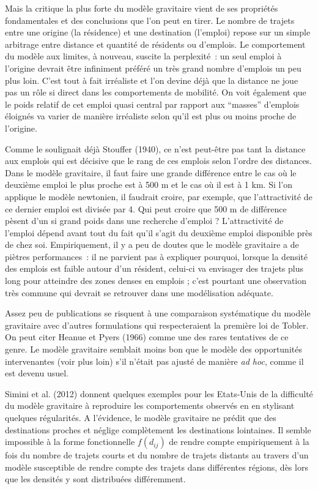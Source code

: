 \documentclass[
  10pt,
  a4paper,
  numbers=noendperiod,
  DIV=9]{scrreprt}
\begin{document}
Mais la critique la plus forte du modèle gravitaire vient de ses
propriétés fondamentales et des conclusions que l'on peut en tirer. Le
nombre de trajets entre une origine (la résidence) et une destination
(l'emploi) repose sur un simple arbitrage entre distance et quantité de
résidents ou d'emplois. Le comportement du modèle aux limites, à
nouveau, suscite la perplexité~: un seul emploi à l'origine devrait être
infiniment préféré un très grand nombre d'emplois un peu plus loin.
C'est tout à fait irréaliste et l'on devine déjà que la distance ne joue
pas un rôle si direct dans les comportements de mobilité. On voit
également que le poids relatif de cet emploi quasi central par rapport
aux ``masses'' d'emplois éloignés va varier de manière irréaliste selon
qu'il est plus ou moins proche de l'origine.

Comme le soulignait déjà Stouffer (1940), ce n'est peut-être pas tant la
distance aux emplois qui est décisive que le rang de ces emplois selon
l'ordre des distances. Dans le modèle gravitaire, il faut faire une
grande différence entre le cas où le deuxième emploi le plus proche est
à 500 m et le cas où il est à 1 km. Si l'on applique le modèle
newtonien, il faudrait croire, par exemple, que l'attractivité de ce
dernier emploi est divisée par 4. Qui peut croire que 500 m de
différence pèsent d'un si grand poids dans une recherche d'emploi ?
L'attractivité de l'emploi dépend avant tout du fait qu'il s'agit du
deuxième emploi disponible près de chez soi. Empiriquement, il y a peu
de doutes que le modèle gravitaire a de piètres performances~: il ne
parvient pas à expliquer pourquoi, lorsque la densité des emplois est
faible autour d'un résident, celui-ci va envisager des trajets plus long
pour atteindre des zones denses en emplois ; c'est pourtant une
observation très commune qui devrait se retrouver dans une modélisation
adéquate.

Assez peu de publications se risquent à une comparaison systématique du
modèle gravitaire avec d'autres formulations qui respecteraient la
première loi de Tobler. On peut citer Heanue et Pyers (1966) comme une
des rares tentatives de ce genre. Le modèle gravitaire semblait moins
bon que le modèle des opportunités intervenantes (voir plus loin) s'il
n'était pas ajusté de manière \emph{ad hoc}, comme il est devenu usuel.

Simini et al. (2012) donnent quelques exemples pour les Etats-Unis de la
difficulté du modèle gravitaire à reproduire les comportements observés
en en stylisant quelques régularités. A l'évidence, le modèle gravitaire
ne prédit que des destinations proches et néglige complètement les
destinations lointaines. Il semble impossible à la forme fonctionnelle
\(f(d_{ij})\) de rendre compte empiriquement à la fois du nombre de
trajets courts et du nombre de trajets distants au travers d'un modèle
susceptible de rendre compte des trajets dans différentes régions, dès
lors que les densités y sont distribuées différemment.
\end{document}
